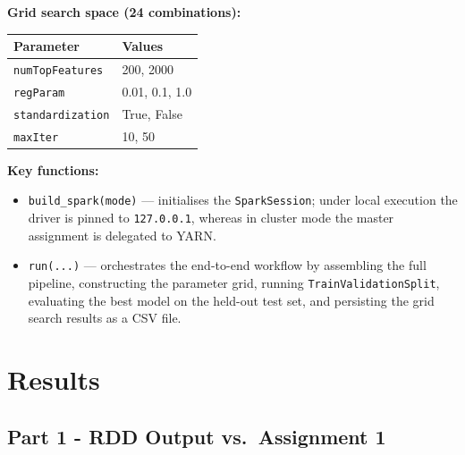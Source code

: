 \documentclass[11pt,a4paper]{extarticle}
\begin{document}
\vspace{0.4em}
\textbf{Grid search space (24 combinations):}

\begin{center}
\begin{tabular}{ll}
\toprule
\textbf{Parameter} & \textbf{Values} \\
\midrule
\texttt{numTopFeatures} & 200, 2000 \\
\texttt{regParam}       & 0.01, 0.1, 1.0 \\
\texttt{standardization}& True, False \\
\texttt{maxIter}        & 10, 50 \\
\bottomrule
\end{tabular}
\end{center}

\vspace{0.4em}
\textbf{Key functions:}

\begin{itemize}
  \item \texttt{build\_spark(mode)} --- initialises the \texttt{SparkSession}; under local execution the driver is pinned to \texttt{127.0.0.1}, whereas in cluster mode the master assignment is delegated to YARN.
  \item \texttt{run(...)} --- orchestrates the end-to-end workflow by assembling the full pipeline, constructing the parameter grid, running \texttt{TrainValidationSplit}, evaluating the best model on the held-out test set, and persisting the grid search results as a CSV file.
\end{itemize}


\section{Results}

\subsection{Part 1 - RDD Output vs.\ Assignment 1}
\end{document}
